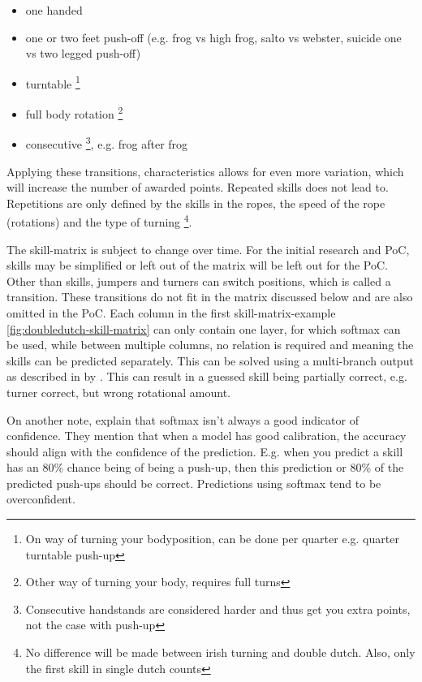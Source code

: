 \begin{itemize}
    \item one handed
    \item one or two feet push-off (e.g. frog vs high frog, salto vs webster, suicide one vs two legged push-off)
    \item turntable \footnote{On way of turning your bodyposition, can be done per quarter e.g. quarter turntable push-up}
    \item full body rotation \footnote{Other way of turning your body, requires full turns}
    \item consecutive \footnote{Consecutive handstands are considered harder and thus get you extra points, not the case with push-up}, e.g. frog after frog
\end{itemize}

Applying these transitions, characteristics allows for even more variation, which will increase the number of awarded points. Repeated skills does not lead to. Repetitions are only defined by the skills in the ropes, the speed of the rope (rotations) and the type of turning \footnote{No difference will be made between irish turning and double dutch. Also, only the first skill in single dutch counts}.

\medskip

The skill-matrix is subject to change over time. For the initial research and PoC, skills may be simplified or left out of the matrix will be left out for the PoC. Other than skills, jumpers and turners can switch positions, which is called a transition. These transitions do not fit in the matrix discussed below and are also omitted in the PoC.
Each column in the first skill-matrix-example \ref{fig:doubledutch-skill-matrix} can only contain one layer, for which softmax can be used, while between multiple columns, no relation is required and meaning the skills can be predicted separately. This can be solved using a multi-branch output as described in by \textcite{Coulibaly_2022}. This can result in a guessed skill being partially correct, e.g. turner correct, but wrong rotational amount.




On another note, \textcite{Guo_2017} explain that softmax isn't always a good indicator of confidence. They mention that when a model has good calibration, the accuracy should align with the confidence of the prediction. E.g. when you predict a skill has an 80\% chance being of being a push-up, then this prediction or 80\% of the predicted push-ups should be correct. Predictions using softmax tend to be overconfident.



